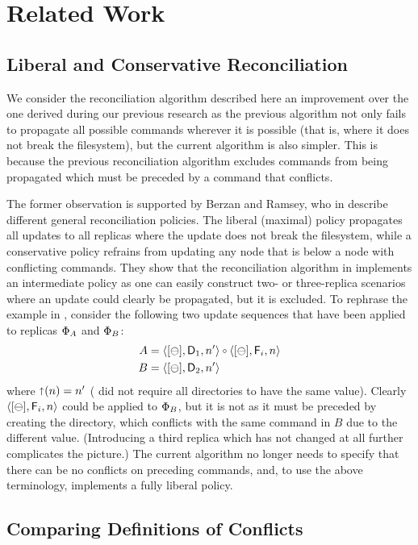 
\section{Related Work}

\subsection{Liberal and Conservative Reconciliation}

We consider the reconciliation algorithm described here an improvement over
the one derived during our previous research \cite{NREC}
as the previous algorithm not only fails to propagate all possible commands
wherever it is possible (that is, where it does not break the filesystem),
but the current algorithm is also simpler.
This is because the previous reconciliation algorithm excludes
commands from being propagated which must be preceded by a command that conflicts.

The former observation is supported by Berzan and Ramsey, who in \cite{CBNR} 
describe different general reconciliation policies.
The liberal (maximal) policy propagates all updates to all replicas where
the update does not break the filesystem, while a conservative policy
refrains from updating any node that is below a node with conflicting commands.
They show that the reconciliation algorithm in \cite{NREC} implements
an intermediate policy as one can easily construct two- or three-replica scenarios
where an update could clearly be propagated, but it is excluded.
To rephrase the example in \cite{CBNR}, consider the following two
update sequences that have been applied to replicas $\Phi_A$ and $\Phi_B$:
\begin{align*}
A&=\caaa{\empt}{\valdi}{\nn}\cc\caaa{\empt}{\valf}{n} \\
B&=\caaa{\empt}{\valdii}{\nn}
\end{align*}
where $\mathord{\shortuparrow}(n)=n'$ (\cite{NREC} did not require all directories to have the same value).
Clearly $\langle{[\ominus],\mathsf{F}_i,n}\rangle$ could be applied to $\Phi_B$, but it is not as
it must be preceded by creating the directory, which conflicts with the same command in $B$
due to the different value.
(Introducing a third replica which has not changed at all further complicates the picture.)
The current algorithm no longer needs to specify that there can be no conflicts
on preceding commands, and, to use the above terminology, implements a fully liberal policy.


\subsection{Comparing Definitions of Conflicts}

